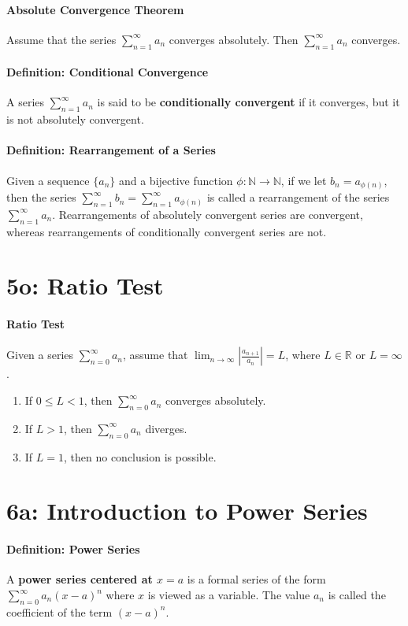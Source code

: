 \documentclass[10pt,letter]{article}
\begin{document}
\paragraph{Absolute Convergence Theorem}
Assume that the series $\sum_{n=1}^\infty a_n$ converges absolutely. Then $\sum_{n=1}^\infty a_n$ converges. 
\paragraph{Definition: Conditional Convergence}
A series $\sum_{n=1}^\infty a_n$ is said to be \textbf{conditionally convergent} if it converges, but it is not absolutely convergent. 
\paragraph{Definition: Rearrangement of a Series}
Given a sequence $\{a_n\}$ and a bijective function $\phi:\mathbb{N}\rightarrow\mathbb{N}$, if we let $b_n=a_{\phi(n)}$, then the series $\sum_{n=1}^\infty b_n=\sum_{n=1}^\infty a_{\phi(n)}$ is called a rearrangement of the series $\sum_{n=1}^\infty a_n$. Rearrangements of absolutely convergent series are convergent, whereas rearrangements of conditionally convergent series are not. 


\section*{5o: Ratio Test}
\paragraph{Ratio Test}
Given a series $\sum_{n=0}^\infty a_n$, assume that $\lim_{n\rightarrow\infty}\left|\frac{a_{n+1}}{a_n}\right|=L$, where $L\in\mathbb{R}$ or $L=\infty$. \begin{enumerate}
    \item If $0\leq L<1$, then $\sum_{n=0}^\infty a_n$ converges absolutely. 
    \item If $L>1$, then $\sum_{n=0}^\infty a_n$ diverges. 
    \item If $L=1$, then no conclusion is possible. 
\end{enumerate}

\section*{6a: Introduction to Power Series}
\paragraph{Definition: Power Series}
A \textbf{power series centered at $x=a$} is a formal series of the form $\sum_{n=0}^\infty a_n(x-a)^n$ where $x$ is viewed as a variable. The value $a_n$ is called the coefficient of the term $(x-a)^n$. 
\end{document}
